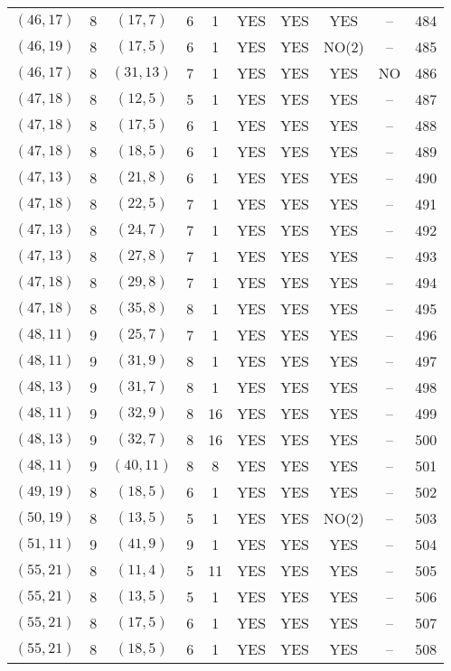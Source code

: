 \begin{longtable}{|c|c|c|c|c|c|c|c|c|c|}
$(46, 17)$ & 8 & $(17, 7)$ & 6 & 1 & YES & YES & YES & -- & 484\\
$(46, 19)$ & 8 & $(17, 5)$ & 6 & 1 & YES & YES & NO(2) & -- & 485\\
$(46, 17)$ & 8 & $(31, 13)$ & 7 & 1 & YES & YES & YES & NO & 486\\
$(47, 18)$ & 8 & $(12, 5)$ & 5 & 1 & YES & YES & YES & -- & 487\\
$(47, 18)$ & 8 & $(17, 5)$ & 6 & 1 & YES & YES & YES & -- & 488\\
$(47, 18)$ & 8 & $(18, 5)$ & 6 & 1 & YES & YES & YES & -- & 489\\
$(47, 13)$ & 8 & $(21, 8)$ & 6 & 1 & YES & YES & YES & -- & 490\\
$(47, 18)$ & 8 & $(22, 5)$ & 7 & 1 & YES & YES & YES & -- & 491\\
$(47, 13)$ & 8 & $(24, 7)$ & 7 & 1 & YES & YES & YES & -- & 492\\
$(47, 13)$ & 8 & $(27, 8)$ & 7 & 1 & YES & YES & YES & -- & 493\\
$(47, 18)$ & 8 & $(29, 8)$ & 7 & 1 & YES & YES & YES & -- & 494\\
$(47, 18)$ & 8 & $(35, 8)$ & 8 & 1 & YES & YES & YES & -- & 495\\
$(48, 11)$ & 9 & $(25, 7)$ & 7 & 1 & YES & YES & YES & -- & 496\\
$(48, 11)$ & 9 & $(31, 9)$ & 8 & 1 & YES & YES & YES & -- & 497\\
$(48, 13)$ & 9 & $(31, 7)$ & 8 & 1 & YES & YES & YES & -- & 498\\
$(48, 11)$ & 9 & $(32, 9)$ & 8 & 16 & YES & YES & YES & -- & 499\\
$(48, 13)$ & 9 & $(32, 7)$ & 8 & 16 & YES & YES & YES & -- & 500\\
$(48, 11)$ & 9 & $(40, 11)$ & 8 & 8 & YES & YES & YES & -- & 501\\
$(49, 19)$ & 8 & $(18, 5)$ & 6 & 1 & YES & YES & YES & -- & 502\\
$(50, 19)$ & 8 & $(13, 5)$ & 5 & 1 & YES & YES & NO(2) & -- & 503\\
$(51, 11)$ & 9 & $(41, 9)$ & 9 & 1 & YES & YES & YES & -- & 504\\
$(55, 21)$ & 8 & $(11, 4)$ & 5 & 11 & YES & YES & YES & -- & 505\\
$(55, 21)$ & 8 & $(13, 5)$ & 5 & 1 & YES & YES & YES & -- & 506\\
$(55, 21)$ & 8 & $(17, 5)$ & 6 & 1 & YES & YES & YES & -- & 507\\
$(55, 21)$ & 8 & $(18, 5)$ & 6 & 1 & YES & YES & YES & -- & 508\\

\end{longtable}
